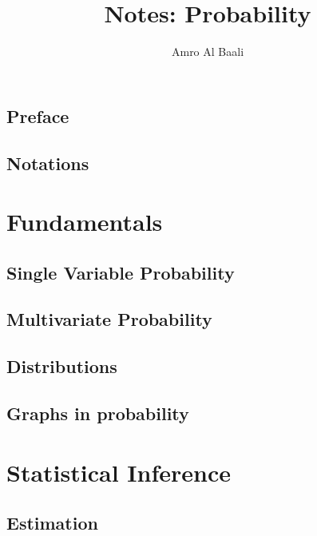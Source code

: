 \documentclass{Templates/amro-notes}
\title{Notes: Probability}
\author{{Amro Al Baali}}
\date{\daterange}
\begin{document}
\maketitle
\tableofcontents
{} 


\chapter*{Preface}


\clearpage
\chapter*{Notations}


\clearpage
{} 
\part{Fundamentals}

\chapter{Single Variable Probability}


\clearpage
\chapter{Multivariate Probability}


\clearpage
\chapter{Distributions}


\clearpage
\chapter{Graphs in probability}


\clearpage
\part{Statistical Inference}

% 

\chapter{Estimation}



\begin{appendices}
    
\end{appendices}


\end{document}
